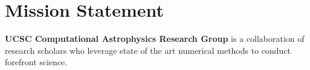 \section{Mission Statement}
\label{sec:mission}
{\bf UCSC Computational Astrophysics Research Group} is a collaboration of
research scholars who leverage state of the art numerical methods to conduct
forefront science.
